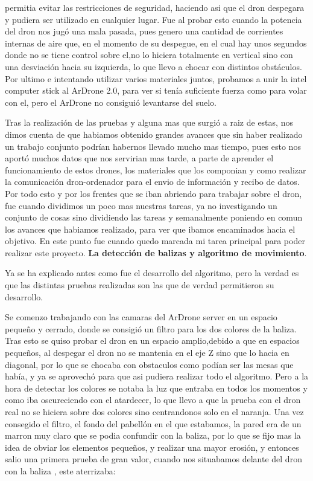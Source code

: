 permitia evitar las restricciones de seguridad, haciendo asi que el dron despegara y pudiera ser utilizado en cualquier lugar. Fue al probar esto cuando la potencia del dron nos jug\'o una mala pasada, pues genero una cantidad de corrientes internas de aire que, en el momento de su despegue, en el cual hay unos segundos donde no se tiene control sobre el,no lo hiciera totalmente en vertical sino con una desviaci\'on hacia su izquierda, lo que llevo a chocar con distintos obst\'aculos. Por ultimo e intentando utilizar varios materiales juntos, probamos a unir la intel computer stick al ArDrone 2.0, para ver si ten\'ia suficiente fuerza como para volar con el, pero el ArDrone no consigui\'o levantarse del suelo. 

\hspace{1 cm} Tras la realizaci\'on de las pruebas y alguna mas que surgi\'o a raiz de estas, nos dimos cuenta de que habiamos obtenido grandes avances que sin haber realizado un trabajo conjunto podr\'ian habernos llevado mucho mas tiempo, pues esto nos aport\'o muchos datos que nos servirian mas tarde, a parte de aprender el funcionamiento de estos drones, los materiales que los componian y como realizar la comunicaci\'on dron-ordenador para el envio de informaci\'on y recibo de datos. Por todo esto y por los frentes que se iban abriendo para trabajar sobre el dron, fue cuando dividimos un poco mas nuestras tareas, ya no investigando un conjunto de cosas sino dividiendo las tareas y semanalmente poniendo en comun los avances que habiamos realizado, para ver que ibamos encaminados hacia el objetivo. En este punto fue cuando quedo marcada mi tarea principal para poder realizar este proyecto. \textbf{La detecci\'on de balizas y algoritmo de movimiento}. 


\hspace{1 cm} Ya se ha explicado antes como fue el desarrollo del algoritmo, pero la verdad es que las distintas pruebas realizadas son las que de verdad permitieron su desarrollo. 



\hspace{1 cm} Se comenzo trabajando con las camaras del ArDrone server en un espacio pequeño y cerrado, donde se consigi\'o un filtro para los dos colores de la baliza. Tras esto se quiso probar el dron en un espacio amplio,debido a que en espacios pequeños, al despegar el dron no se mantenia en el eje Z sino que lo hacia en diagonal, por lo que se chocaba con obstaculos como pod\'ian ser las mesas que hab\'ia, y ya se aprovech\'o para que asi pudiera realizar todo el algoritmo. Pero a la hora de detectar los colores se notaba la luz que entraba en todos los momentos y como iba oscureciendo con el atardecer, lo que llevo a que la prueba con el dron real no se hiciera sobre dos colores sino centrandonos solo en el naranja. Una vez consegido el filtro, el fondo del pabell\'on en el que estabamos, la pared era de un marron muy claro que se podia confundir con la baliza, por lo que se fijo mas la idea de obviar los elementos pequeños, y realizar una mayor erosi\'on, y entonces salio una primera prueba de gran valor, cuando nos situabamos delante del dron con la baliza , este aterrizaba:



